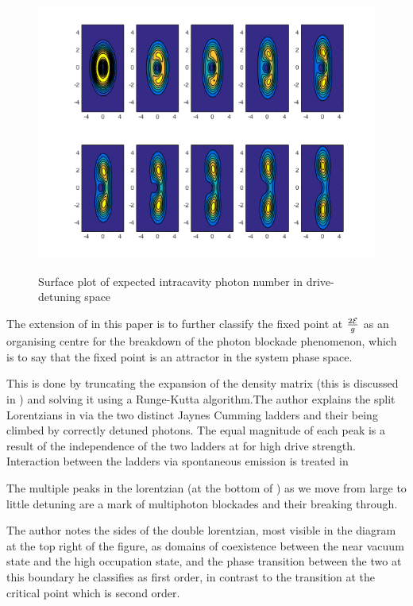 \begin{figure}[h]
\begin{minipage}{.3\linewidth}
    \includegraphics[width=1\textwidth]{Images/Q-Bifurcation.png}
    \label{fig:Qbirfc}
  \end{minipage}
  \caption{Surface plot of expected intracavity photon number in drive-detuning space}
\end{figure}

The extension of \autocite{Alsing1999} in this paper is to further classify the fixed point at $\frac{2\mathcal{E}}{g}$ as an organising centre for the breakdown of the photon blockade phenomenon, which is to say that the fixed point is an attractor in the system phase space.

This is done by truncating the expansion of the density matrix (this is discussed in \autocite{Savage1988}) and solving it using a Runge-Kutta algorithm.The author explains the split Lorentzians in \autocite[Figure 1]{Carmichael2015} via the two distinct Jaynes Cumming ladders and their being climbed by correctly detuned photons. The equal magnitude of each peak is a result of the independence of the two ladders at for high drive strength. Interaction between the ladders via spontaneous emission is treated in \autocite[Section V]{Carmichael2015}

The multiple peaks in the lorentzian (at the bottom of \autocite[Figure 1]{Carmichael2015}) as we move from large to little detuning are a mark of multiphoton blockades and their breaking through.

The author notes the sides of the double lorentzian, most visible in the diagram at the top right of the figure, as domains of coexistence between the near vacuum state and the high occupation state, and the phase transition between the two at this boundary he classifies as first order, in contrast to the transition at the critical point which is second order.

